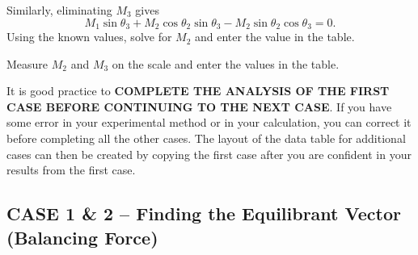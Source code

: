Similarly, eliminating $M_3$ gives
\begin{equation}
  \label{eq:M01solveM2}
  M_1 \sin \theta_3  + M_2 \cos \theta_2 \sin \theta_3 - M_2 \sin \theta_2 \cos \theta_3 = 0.
\end{equation}
Using the known values, solve for $M_2$ and enter the value in the table.

Measure $M_2$ and $M_3$ on the scale and enter the values in the table.











It is good practice to \textbf{COMPLETE THE ANALYSIS OF THE FIRST CASE BEFORE CONTINUING TO THE NEXT CASE}. If you have some error in your experimental method or in your calculation, you can correct it before completing all the other cases. The layout of the data table for additional cases can then be created by copying the first case after you are confident in your results from the first case.


\subsection{CASE 1 \& 2 -- Finding the Equilibrant Vector (Balancing Force)}

